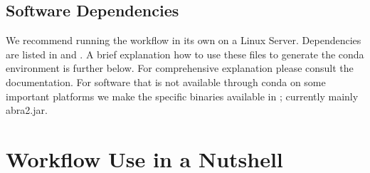 \documentclass[letterpaper,10pt,english]{sphinxhowto}
\begin{document}
\subsection{Software Dependencies}
\label{\detokenize{index:software-dependencies}}
We recommend running the workflow in its own  on a Linux Server. Dependencies are listed in  and . A brief explanation how to use these files to generate the conda environment is further below. For comprehensive explanation please consult the  documentation. For software that is not available through conda on some important platforms we make the specific binaries available in ; currently mainly abra2.jar.


\section{Workflow Use in a Nutshell}
\label{\detokenize{index:workflow-use-in-a-nutshell}}
\end{document}
